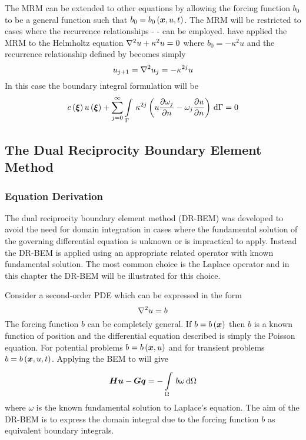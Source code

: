 The MRM can be extended to other equations by allowing the forcing function
$b_{0}$ to be a general function such that $b_{0} = \fnof{b_{0}}{\vect{x},u,t}$.
The MRM will be restricted to cases where the recurrence relationships -
 - can be employed.  \citet{brebbia:1989}
have applied the MRM to the Helmholtz equation $\laplacian{}{u} + \kappa^{2} u =
0$ where $b_{0} = -\kappa^{2} u$ and the recurrence relationship defined by
 becomes simply 
\begin{equation}
  u_{j+1} = \laplacian{}{u_{j}} = - \kappa^{2j} u
\end{equation}
In this case the boundary integral formulation will be
\begin{equation}
  \fnof{c}{\vect{\xi}} \fnof{u}{\vect{\xi}} + \dsuml{j=0}{\infty}
  \goneint{\kappa^{2j} \pbrac{u \delby{\omega_{j}}{n} -
    \omega_{j} \delby{u}{n}}}{\Gamma} = 0
\end{equation}

\subsection{The Dual Reciprocity Boundary Element Method}

\subsubsection{Equation Derivation}

The dual reciprocity boundary element method (DR-BEM) was developed to
avoid the need for domain integration in cases where the fundamental
solution of the governing differential equation is unknown or is
impractical to apply.  Instead the DR-BEM is applied using an appropriate
related operator with known fundamental solution.  The most common choice
is the Laplace operator \citep{partridge:1992} and in this chapter the DR-BEM
will be illustrated for this choice.

Consider a second-order PDE which can be expressed in the form
\begin{equation}
  \laplacian{}{u} = b
\label{eq:drmbase}
\end{equation}
The forcing function $b$ can be completely general. If $b = \fnof{b}{\vect{x}}$
then $b$ is a known function of position and the differential equation
described is simply the Poisson equation. For potential problems $b =
\fnof{b}{\vect{x},u}$ and for transient problems $b = \fnof{b}{\vect{x},u,t}$.
Applying the BEM to  will give
\begin{equation}
  \matr{H} \vect{u} - \matr{G} \vect{q} = -\goneint{b \omega}{\Omega}
\end{equation}
where $\omega$ is the known fundamental solution to Laplace's equation.
The aim of the DR-BEM is to express the domain integral due to the forcing
function $b$ as equivalent boundary integrals.

